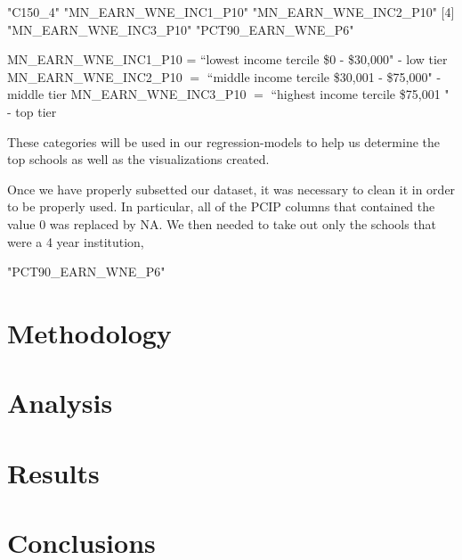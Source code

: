 \documentclass{article}
\begin{document}
\begin{Schunk}
\begin{Soutput}
[1] "C150_4"               "MN_EARN_WNE_INC1_P10" "MN_EARN_WNE_INC2_P10"
[4] "MN_EARN_WNE_INC3_P10" "PCT90_EARN_WNE_P6"   
\end{Soutput}
\end{Schunk}

MN\_EARN\_WNE\_INC1\_P10 = ``lowest income tercile \$0 - \$30,000" - low tier \newline
MN\_EARN\_WNE\_INC2\_P10 $=$ ``middle income tercile \$30,001 - \$75,000" - middle tier \newline
MN\_EARN\_WNE\_INC3\_P10 $=$ ``highest income tercile \$75,001  " - top tier \newline

These categories will be used in our regression-models to help us determine the top schools as well as the visualizations created.

Once we have properly subsetted our dataset, it was necessary to clean it in order to be properly used.  In particular, all of the PCIP columns that contained the value 0 was replaced by NA.  We then needed to take out only the schools that were a 4 year institution, 
\begin{Schunk}
\begin{Soutput}
[1] "PCT90_EARN_WNE_P6"
\end{Soutput}
\end{Schunk}


\section{Methodology}

\section{Analysis}

\section{Results}

\section{Conclusions}
\end{document}
